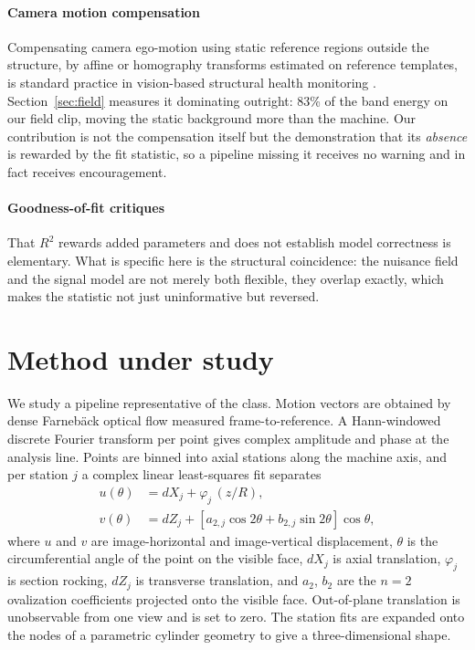 \documentclass[preprint,12pt]{elsarticle}
\begin{document}
\paragraph{Camera motion compensation}
Compensating camera ego-motion using static reference regions outside the
structure, by affine or homography transforms estimated on reference
templates, is standard practice in vision-based structural health monitoring
\cite{chen2017}. Section~\ref{sec:field} measures it dominating outright:
83\% of the band energy on our field clip, moving the static background more
than the machine. Our contribution is not the compensation itself but the
demonstration that its \emph{absence} is rewarded by the fit statistic, so a
pipeline missing it receives no warning and in fact receives encouragement.

\paragraph{Goodness-of-fit critiques}
That $R^2$ rewards added parameters and does not establish model correctness
is elementary. What is specific here is the structural coincidence: the
nuisance field and the signal model are not merely both flexible, they
overlap exactly, which makes the statistic not just uninformative but
reversed.

\section{Method under study}
\label{sec:method}

We study a pipeline representative of the class. Motion vectors are obtained
by dense Farneb\"ack optical flow measured frame-to-reference. A
Hann-windowed discrete Fourier transform per point gives complex amplitude
and phase at the analysis line. Points are binned into axial stations along
the machine axis, and per station $j$ a complex linear least-squares fit
separates
\begin{align}
u(\theta) &= dX_j + \varphi_j\,(z/R), \label{eq:u}\\
v(\theta) &= dZ_j + \left[a_{2,j}\cos 2\theta
             + b_{2,j}\sin 2\theta\right]\cos\theta, \label{eq:v}
\end{align}
where $u$ and $v$ are image-horizontal and image-vertical displacement,
$\theta$ is the circumferential angle of the point on the visible face,
$dX_j$ is axial translation, $\varphi_j$ is section rocking, $dZ_j$ is
transverse translation, and $a_2$, $b_2$ are the $n = 2$ ovalization
coefficients projected onto the visible face. Out-of-plane translation is
unobservable from one view and is set to zero. The station fits are expanded
onto the nodes of a parametric cylinder geometry to give a
three-dimensional shape.
\end{document}
